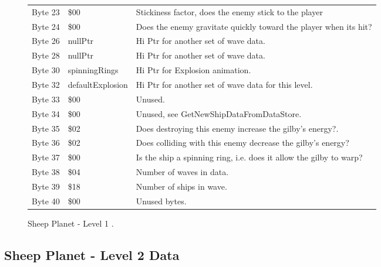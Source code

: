 \begin{figure}[H]
{\begin{adjustbox}{width=12cm}
\begin{tabular}{lll}
 Byte 23 & \$00                       & Stickiness factor, does the enemy stick to the player              \\
 Byte 24 & \$00                       & Does the enemy gravitate quickly toward the player when its hit?   \\
 Byte 26 & nullPtr                   & Hi Ptr for another set of wave data.                               \\
 Byte 28 & nullPtr                   & Hi Ptr for another set of wave data.                               \\
 Byte 30 & spinningRings             & Hi Ptr for Explosion animation.                                    \\
 Byte 32 & defaultExplosion          & Hi Ptr for another set of wave data for this level.                \\
 Byte 33 & \$00                       & Unused.                                                            \\
 Byte 34 & \$00                       & Unused, see GetNewShipDataFromDataStore.                           \\
 Byte 35 & \$02                       & Does destroying this enemy increase the gilby's energy?.           \\
 Byte 36 & \$02                       & Does colliding with this enemy decrease the gilby's energy?        \\
 Byte 37 & \$00                       & Is the ship a spinning ring, i.e. does it allow the gilby to warp? \\
 Byte 38 & \$04                       & Number of waves in data.                                           \\
 Byte 39 & \$18                       & Number of ships in wave.                                           \\
 Byte 40 & \$00                       & Unused bytes.                                                      \\
\bottomrule
\end{tabular}

  \end{adjustbox}

  }\caption*{Sheep Planet - Level 1
.}
\end{figure}

\clearpage
\subsection{Sheep Planet - Level 2 Data}

